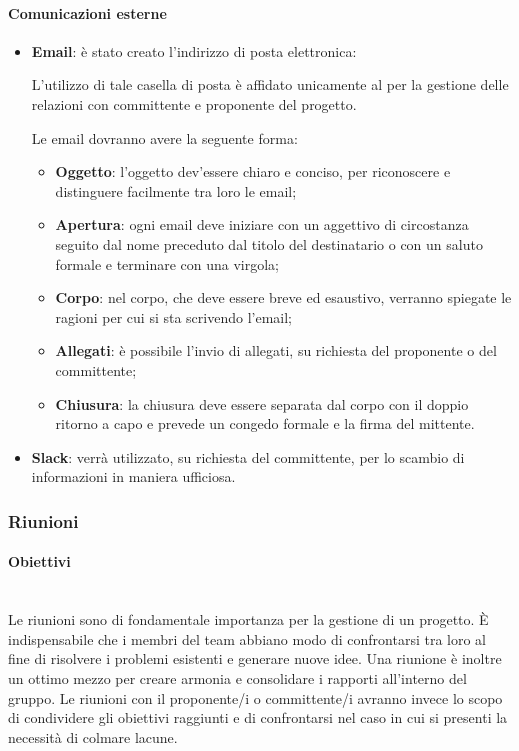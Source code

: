 \paragraph{Comunicazioni esterne}
\begin{itemize}
\item\textbf{Email}: è stato creato l'indirizzo di posta elettronica:
\textbf{\emailgruppo}

L'utilizzo di tale casella di posta è affidato unicamente al \RdP{} per la gestione delle relazioni con committente e proponente del progetto.

Le email dovranno avere la seguente forma:
	\begin{itemize}
	\item\textbf{Oggetto}: l'oggetto dev'essere chiaro e conciso, per riconoscere e distinguere facilmente tra loro le email;
	\item\textbf{Apertura}: ogni email deve iniziare con un aggettivo di circostanza seguito dal nome preceduto dal titolo del destinatario o con un saluto formale e terminare con una virgola;
	\item\textbf{Corpo}: nel corpo, che deve essere breve ed esaustivo, verranno spiegate le ragioni per cui si sta scrivendo l'email;
	\item\textbf{Allegati}: è possibile l'invio di allegati, su richiesta del proponente o del committente;
	\item\textbf{Chiusura}: la chiusura deve essere separata dal corpo con il doppio ritorno a capo e prevede un congedo formale e la firma del mittente.
	\end{itemize}

\item\textbf{Slack}: verrà utilizzato, su richiesta del committente, per lo scambio di informazioni in maniera ufficiosa.
\end{itemize}

\subsubsection{Riunioni}
\paragraph{Obiettivi}
~\\Le riunioni sono di fondamentale importanza per la gestione di un progetto. È indispensabile che i membri del team abbiano
modo di confrontarsi tra loro al fine di risolvere i problemi esistenti e generare nuove idee. Una riunione è inoltre un
ottimo mezzo per creare armonia e consolidare i rapporti all'interno del gruppo. Le riunioni con il proponente/i o committente/i avranno invece lo scopo di condividere gli obiettivi raggiunti e di confrontarsi nel caso in cui si presenti
la necessità di colmare lacune. 
